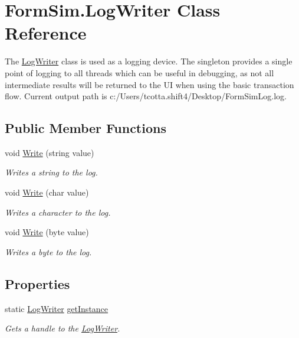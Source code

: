 \hypertarget{class_form_sim_1_1_log_writer}{}\section{Form\+Sim.\+Log\+Writer Class Reference}
\label{class_form_sim_1_1_log_writer}


The \mbox{\hyperlink{class_form_sim_1_1_log_writer}{Log\+Writer}} class is used as a logging device. The singleton provides a single point of logging to all threads which can be useful in debugging, as not all intermediate results will be returned to the UI when using the basic transaction flow. Current output path is c\+:/\+Users/tcotta.shift4/\+Desktop/\+Form\+Sim\+Log.\+log.  


\subsection*{Public Member Functions}
\begin{DoxyCompactItemize}
\item 
void \mbox{\hyperlink{class_form_sim_1_1_log_writer_a68f7b66a739339396ee0b575813fd986}{Write}} (string value)
\begin{DoxyCompactList}\small\item\em Writes a string to the log. \end{DoxyCompactList}\item 
void \mbox{\hyperlink{class_form_sim_1_1_log_writer_ade1899b921aefffbe53695cfde35cd99}{Write}} (char value)
\begin{DoxyCompactList}\small\item\em Writes a character to the log. \end{DoxyCompactList}\item 
void \mbox{\hyperlink{class_form_sim_1_1_log_writer_a50cd130c993c0412f9e563f9baabb8b4}{Write}} (byte value)
\begin{DoxyCompactList}\small\item\em Writes a byte to the log. \end{DoxyCompactList}\end{DoxyCompactItemize}
\subsection*{Properties}
\begin{DoxyCompactItemize}
\item 
static \mbox{\hyperlink{class_form_sim_1_1_log_writer}{Log\+Writer}} \mbox{\hyperlink{class_form_sim_1_1_log_writer_ac885dc41c236f618e066cdcee8189f64}{get\+Instance}}
\begin{DoxyCompactList}\small\item\em Gets a handle to the \mbox{\hyperlink{class_form_sim_1_1_log_writer}{Log\+Writer}}. \end{DoxyCompactList}\end{DoxyCompactItemize}
